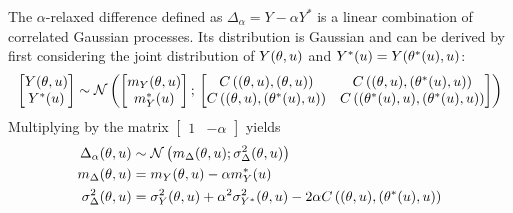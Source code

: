 \documentclass[../../Main_ManuscritThese.tex]{subfiles}
\begin{document}
The $\alpha$-relaxed difference defined as  $\Delta_{\alpha} = Y - \alpha Y^*$ is a linear combination of correlated Gaussian processes. Its distribution is Gaussian and can be derived by first considering the joint distribution of $Y(\theta,u)$ and $Y^*(u) = Y(\theta^*(u), u)$:
\begin{equation}
  \begin{bmatrix}
    Y(\theta,u) \\
    Y^*(u)
  \end{bmatrix}
  \sim \mathcal{N}\left(
    \begin{bmatrix}
      m_Y(\theta,u) \\
      m_Y^*(u)
    \end{bmatrix}
    ;\,
    \begin{bmatrix}
      C\left((\theta,u),(\theta,u)\right) & C\left((\theta,u),(\theta^*(u),u)\right) \\
      C\left((\theta,u),(\theta^*(u),u)\right) & C\left((\theta^*(u),u),(\theta^*(u),u)\right)
    \end{bmatrix}
\right)
\end{equation}
Multiplying by the matrix $\begin{bmatrix}1 & -\alpha \end{bmatrix}$ yields
\begin{align}
  \Delta_{\alpha}(\theta,u) &\sim \mathcal{N}\left(m_{\Delta}(\theta,u); \sigma^2_{\Delta}(\theta,u)\right)  \label{eq:delta_GP}\\
  m_{\Delta}(\theta,u) &= m_Y(\theta,u) - \alpha m_Y^*(u) \label{eq:mu_delta_GP}\\
  \sigma^2_{\Delta}(\theta,u) &= \sigma_Y^2(\theta,u) + \alpha^2 \sigma_{Y^*}^2(\theta,u) - 2\alpha C\left((\theta,u),(\theta^*(u),u)\right) \label{eq:variance_delta_GP}
\end{align}
\end{document}
